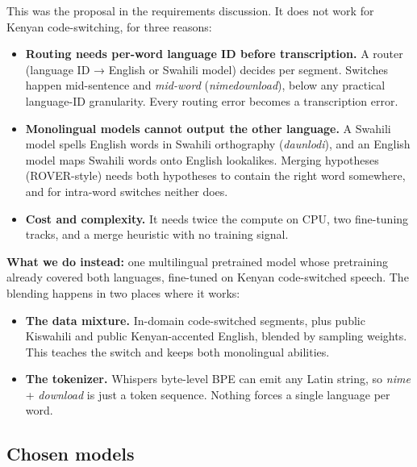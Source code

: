 \documentclass[11pt]{article}
\begin{document}
This was the proposal in the requirements discussion. It does not work for Kenyan code-switching, for three reasons:

\begin{itemize}
\tightlist
\item
  \textbf{Routing needs per-word language ID before transcription.} A router (language ID → English or Swahili model) decides per segment. Switches happen mid-sentence and \emph{mid-word} (\emph{nimedownload}), below any practical language-ID granularity. Every routing error becomes a transcription error.
\item
  \textbf{Monolingual models cannot output the other language.} A Swahili model spells English words in Swahili orthography (\emph{daunlodi}), and an English model maps Swahili words onto English lookalikes. Merging hypotheses (ROVER-style) needs both hypotheses to contain the right word somewhere, and for intra-word switches neither does.
\item
  \textbf{Cost and complexity.} It needs twice the compute on CPU, two fine-tuning tracks, and a merge heuristic with no training signal.
\end{itemize}

\textbf{What we do instead:} one multilingual pretrained model whose pretraining already covered both languages, fine-tuned on Kenyan code-switched speech. The blending happens in two places where it works:

\begin{itemize}
\tightlist
\item
  \textbf{The data mixture.} In-domain code-switched segments, plus public Kiswahili and public Kenyan-accented English, blended by sampling weights. This teaches the switch and keeps both monolingual abilities.
\item
  \textbf{The tokenizer.} Whisper\textquotesingle s byte-level BPE can emit any Latin string, so \emph{nime} + \emph{download} is just a token sequence. Nothing forces a single language per word.
\end{itemize}

\hypertarget{chosen-models}{%
\subsection{Chosen models}\label{chosen-models}}
\end{document}
